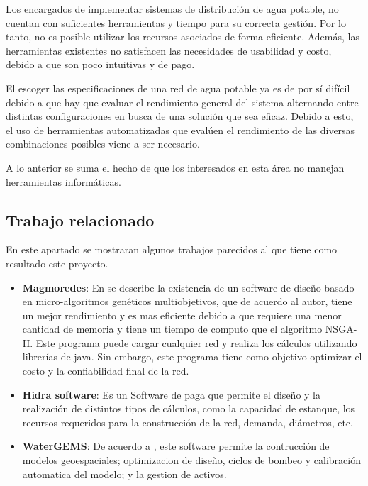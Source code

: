 \documentclass[11pt,letterpaper]{article}
\begin{document}
Los encargados de implementar sistemas de distribución de agua potable, no cuentan con suficientes herramientas y  tiempo para su correcta gestión. Por lo tanto, no es posible utilizar los recursos asociados de forma eficiente. Además, las herramientas existentes no satisfacen las necesidades de usabilidad y costo, debido a que son poco intuitivas y de pago.

El escoger las especificaciones de una red de agua potable ya es de por sí difícil debido a que hay que evaluar el rendimiento general del sistema alternando entre distintas configuraciones en busca de una solución que sea eficaz. Debido a esto, el uso de herramientas automatizadas que evalúen el rendimiento de las diversas combinaciones posibles viene a ser necesario.

A lo anterior se suma el hecho de que los interesados en esta área no manejan herramientas informáticas.




\subsection{Trabajo relacionado} 

En este apartado se mostraran algunos trabajos parecidos al que tiene como resultado este proyecto.

\begin{itemize}
	\item \textbf{Magmoredes}: En \cite{Edwin2017} se describe la existencia de un software de diseño basado en micro-algoritmos genéticos multiobjetivos, que de acuerdo al autor, tiene un mejor rendimiento y es mas eficiente debido a que requiere una menor cantidad de memoria y tiene un tiempo de computo que el algoritmo NSGA-II. Este programa puede cargar cualquier red y realiza los cálculos utilizando librerías de java. Sin embargo, este programa tiene como objetivo optimizar el costo y la confiabilidad final de la red.
	\item \textbf{Hidra software}: Es un Software de paga que permite el diseño y la realización de distintos tipos de cálculos, como la capacidad de estanque, los recursos requeridos para la construcción de la red, demanda, diámetros, etc.
	\item \textbf{WaterGEMS}: De acuerdo a \cite{Bentley2017}, este software permite la  contrucción de modelos geoespaciales; optimizacion de diseño, ciclos de bombeo y calibración automatica del modelo; y la  gestion de activos. 
\end{itemize}
\end{document}

